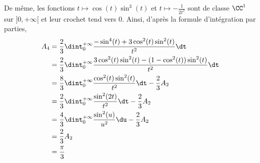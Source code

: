 \begin{solution}
De même, les fonctions $t \mapsto \cos(t) \sin^3(t)$ et $t \mapsto -\frac{1}{2 t^2}$ sont de classe $\CC^1$ sur $]0, +\infty[$ et leur crochet tend vers $0$. Ainsi, d'après la formule d'intégration par parties,
\begin{align*}
A_4 &= \frac{2}{3} \dint_0^{+\infty} \frac{-\sin^4(t) + 3 \cos^2(t) \sin^2(t)}{t^2} \dt \\
&= \frac{2}{3} \dint_0^{+\infty} \frac{3 \cos^2(t) \sin^2(t) - (1 - \cos^2(t)) \sin^2(t)}{t^2} \dt \\
&= \frac{8}{3} \dint_0^{+\infty} \frac{\cos^2(t) \sin^2(t)}{t^2} \dt - \frac{2}{3} A_2 \\
&= \frac{2}{3} \dint_0^{+\infty} \frac{\sin^2(2t)}{t^2} \dt - \frac{2}{3} A_2 \\
&= \frac{4}{3} \dint_0^{+\infty} \frac{\sin^2(u)}{u^2} \du - \frac{2}{3} A_2 \\
&= \frac{2}{3} A_2 \\
&= \frac{\pi}{3}
\end{align*}
\end{solution}
% 
